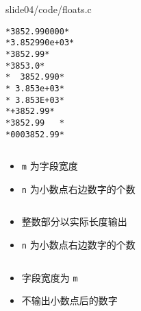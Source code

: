 \begin{frame}[fragile]

{slide04/code/floats.c}
\end{frame}

\begin{frame}[fragile]
\begin{lstlisting}[showspaces=true,backgroundcolor=\color{red!20}]
*3852.990000*
*3.852990e+03*
*3852.99*
*3853.0*
*  3852.990*
* 3.853e+03*
* 3.853E+03*
*+3852.99*
*3852.99   *
*0003852.99*
\end{lstlisting}
\end{frame}

\begin{frame}[fragile]
\begin{lstlisting}[backgroundcolor=\color{red!20}]
%m.nf     %m.ne      %m.nE
\end{lstlisting}

\begin{itemize}
\item \lstinline|m| 为字段宽度
\item \lstinline|n| 为小数点右边数字的个数
\end{itemize} \pause 

\begin{lstlisting}[backgroundcolor=\color{red!20}] 
%.nf
\end{lstlisting}

\begin{itemize}
\item 整数部分以实际长度输出
\item \lstinline|n| 为小数点右边数字的个数
\end{itemize} \pause 

\begin{lstlisting}[backgroundcolor=\color{red!20}] 
%m.f
\end{lstlisting}

\begin{itemize}
\item 字段宽度为 \lstinline|m|
\item 不输出小数点后的数字
\end{itemize}
\end{frame}


